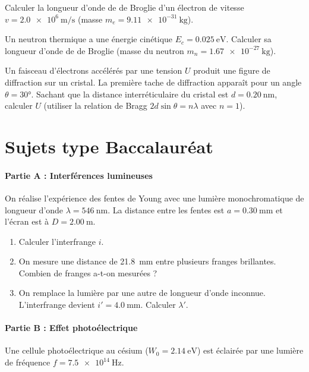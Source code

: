 
\exo{}
Calculer la longueur d'onde de de Broglie d'un électron de vitesse \(v = \SI{2.0e6}{\metre\per\second}\) (masse \(m_e = \SI{9.11e-31}{\kilogram}\)).

\exo{}
Un neutron thermique a une énergie cinétique \(E_c = \SI{0.025}{\electronvolt}\). Calculer sa longueur d'onde de de Broglie (masse du neutron \(m_n = \SI{1.67e-27}{\kilogram}\)).

\exo{}
Un faisceau d'électrons accélérés par une tension \(U\) produit une figure de diffraction sur un cristal. La première tache de diffraction apparaît pour un angle \(\theta = \ang{30}\). Sachant que la distance interréticulaire du cristal est \(d = \SI{0.20}{\nano\metre}\), calculer \(U\) (utiliser la relation de Bragg \(2d \sin\theta = n\lambda\) avec \(n=1\)).

\section{Sujets type Baccalauréat}

\paragraph{Partie A : Interférences lumineuses}
On réalise l'expérience des fentes de Young avec une lumière monochromatique de longueur d'onde \(\lambda = \SI{546}{\nano\metre}\). La distance entre les fentes est \(a = \SI{0.30}{\milli\metre}\) et l'écran est à \(D = \SI{2.00}{\metre}\).

\begin{enumerate}
  \item Calculer l'interfrange \(i\).
  \item On mesure une distance de \SI{21.8}{\milli\metre} entre plusieurs franges brillantes. Combien de franges a-t-on mesurées ?
  \item On remplace la lumière par une autre de longueur d'onde inconnue. L'interfrange devient \(i' = \SI{4.0}{\milli\metre}\). Calculer \(\lambda'\).
\end{enumerate}

\paragraph{Partie B : Effet photoélectrique}
Une cellule photoélectrique au césium (\(W_0 = \SI{2.14}{\electronvolt}\)) est éclairée par une lumière de fréquence \(f = \SI{7.5e14}{\hertz}\).

